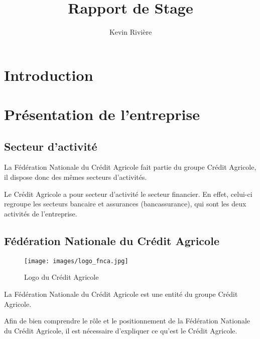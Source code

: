 \documentclass[12pt,a4paper]{article}
\author{Kevin Rivière}
\title{Rapport de Stage}
\begin{document}
\maketitle
\thispagestyle{empty}
\setcounter{page}{0}
\newpage

\tableofcontents
\thispagestyle{empty}
\setcounter{page}{0}
\newpage

\section{Introduction}
\newpage

\section{Présentation de l'entreprise}
\subsection{Secteur d'activité}
La Fédération Nationale du Crédit Agricole fait partie du groupe Crédit Agricole, il dispose donc des mêmes secteurs d'activités.\par
Le Crédit Agricole a pour secteur d'activité le secteur financier.
En effet, celui-ci regroupe les secteurs bancaire et assurances (bancassurance), qui sont les deux activités de l'entreprise.
\subsection{Fédération Nationale du Crédit Agricole}
\begin{figure}[h!]
\centering
\texttt{[image: images/logo\_fnca.jpg]}
\caption{Logo du Crédit Agricole}
\end{figure}
La Fédération Nationale du Crédit Agricole est une entité du groupe Crédit Agricole.\par
Afin de bien comprendre le rôle et le positionnement de la Fédération Nationale du Crédit Agricole, il est nécessaire d'expliquer ce qu'est le Crédit Agricole.
\end{document}
